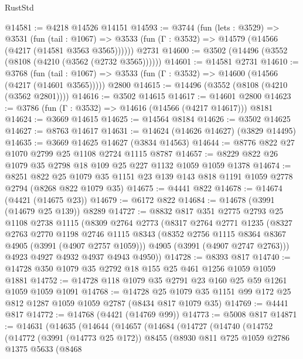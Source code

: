 \begin{lexlean}{RustStd}
\begin{coremodule}
@14581 := @4218 @14526 @14151
@14593 := @3744
    (fun (lets : @3529) =>
    @3531
      (fun (tail : @1067) =>
      @3533 (fun (Γ : @3532) => @14579 (@14566 (@4217 (@14581 @3563 @3565))))))
    @2731
@14600 := @3502 (@14496 (@3552 (@8108 (@4210 (@3562 (@2732 @3565))))))
@14601 := @14581 @2731
@14610 := @3768
    (fun (tail : @1067) => @3533 (fun (Γ : @3532) => @14600 (@14566 (@4217 (@14601 @3565)))))
    @2800
@14615 := @14496 (@3552 (@8108 (@4210 (@3562 @2801))))
@14616 := @3502 @14615
@14617 := @14601 @2800
@14623 := @3786 (fun (Γ : @3532) => @14616 (@14566 (@4217 @14617))) @8181
@14624 := @3669 @14615
@14625 := @14564 @8184
@14626 := @3502 @14625
@14627 := @8763 @14617
@14631 := @14624 (@14626 @14627) (@3829 @14495)
@14635 := @3669 @14625 @14627 (@3834 @14563)
@14644 := @8776 @822 @27 @1070 @2799 @25 @1108 @2724 @1115 @8787
@14657 := @8229 @822 @26 @1079 @35 @2798 @18 @109 @25 @227 @1132 @1059 @1059 @1378
@14674 := @8251
    @822
    @25
    @1079
    @35
    @1151
    @23
    @139
    @143
    @818
    @1191
    @1059
    @2778
    @2794
    (@8268 @822 @1079 @35)
@14675 := @4441 @822
@14678 := @14674 (@4421 (@14675 @23))
@14679 := @6172 @822
@14684 := @14678 (@3991 (@14679 @25 @139)) @8289
@14727 := @8832
    @817
    @351
    @2775
    @2793
    @25
    @1108
    @2738
    @1115
    (@8309
      @2764
      @2773
      (@8317
        @2764
        @2771
        @1235
        (@8327
          @2763
          @2770
          @1198
          @2746
          @1115
          @8343
          (@8352 @2756 @1115 @8364 @8367 @4905 (@3991 (@4907 @2757 @1059)))
          @4905
          (@3991 (@4907 @2747 @2763)))
        @4923
        @4927
        @4932
        @4937
        @4943
        @4950))
@14728 := @8393 @817
@14740 := @14728 @350 @1079 @35 @2792 @18 @155 @25 @461 @1256 @1059 @1059 @1881
@14752 := @14728 @118 @1079 @35 @2791 @23 @160 @25 @59 @1261 @1059 @1059 @1091
@14768 := @14728
    @25
    @1079
    @35
    @1151
    @99
    @172
    @25
    @812
    @1287
    @1059
    @1059
    @2787
    (@8434 @817 @1079 @35)
@14769 := @4441 @817
@14772 := @14768 (@4421 (@14769 @99))
@14773 := @5008 @817
@14871 := @14631
    (@14635
      (@14644
        (@14657
          (@14684
            (@14727
              (@14740
                (@14752
                  (@14772
                    (@3991 (@14773 @25 @172))
                    @8455
                    (@8930
                      @811
                      @725
                      @1059
                      @2786
                      @1375
                      @5633
                      (@8468

\end{coremodule}
\end{lexlean}
